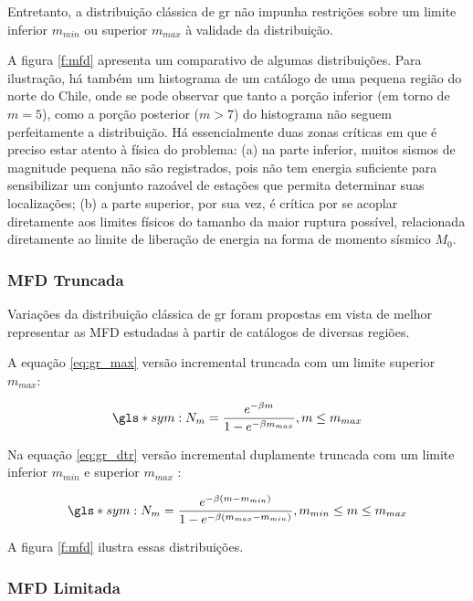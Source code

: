 Entretanto, a distribuição clássica de \gls{gr} não impunha restrições sobre um limite inferior $m_{min}$ 
ou superior $m_{max}$ à validade da distribuição.


A figura \ref{f:mfd} apresenta um comparativo de algumas distribuições. Para ilustração, há também um histograma de um catálogo de
uma pequena região do norte do Chile, onde se pode observar que tanto a porção inferior (em torno de $m=5$), como a porção
posterior ($m > 7$) do histograma não seguem perfeitamente a distribuição. Há essencialmente duas zonas críticas em que é preciso
estar atento à física do problema:
(a) na parte inferior, muitos sismos de magnitude pequena não são registrados, pois não tem energia suficiente para sensibilizar
um conjunto razoável de estações que permita determinar suas localizações; (b) a parte superior, por sua vez, é crítica por se
acoplar diretamente aos limites físicos do tamanho da maior ruptura possível, relacionada diretamente ao limite de liberação de energia 
na forma de momento sísmico $M_0$.


\subsubsection{MFD Truncada}
\label{sec:TMFD}

Variações da distribuição clássica de \gls{gr} foram propostas em vista de melhor representar as MFD estudadas à partir de
catálogos de diversas regiões.

A equação \ref{eq:gr_max} versão incremental truncada com um limite superior $m_{max}$:

\begin{equation}
		\gls*{sym:N_m} = \frac{e^{-\beta m}}{1 -e^{-\beta m_{max}} }, m \leq m_{max}
	\label{eq:gr_max}
\end{equation}

Na equação \ref{eq:gr_dtr} versão incremental duplamente truncada com um limite inferior $m_{min}$ e superior $m_{max}$ :

\begin{equation}
		\gls*{sym:N_m} = \frac{e^{-\beta (m - m_{min})}}{1 -e^{-\beta (m_{max} - m_{min}) } } , m_{min} \leq m \leq m_{max}
	\label{eq:gr_dtr}
\end{equation}

A figura \ref{f:mfd} ilustra essas distribuições.

\subsubsection{MFD Limitada}
\label{sec:BMFD}

